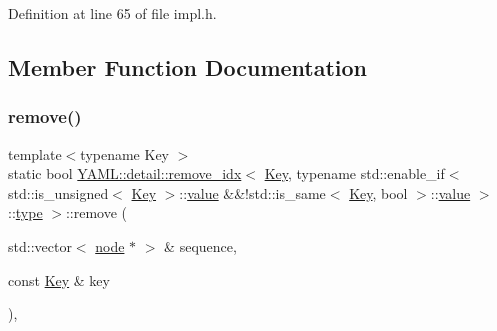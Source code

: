 Definition at line 65 of file impl.\+h.



\subsection{Member Function Documentation}
\mbox{\label{struct_y_a_m_l_1_1detail_1_1remove__idx_3_01_key_00_01typename_01std_1_1enable__if_3_01std_1_1is35fbbe9db9bd491994160c565f84eb78_a93fc34a71dc2dc338f9ebdd23f9e5bab}} 
\subsubsection{\texorpdfstring{remove()}{remove()}}
{\footnotesize\ttfamily template$<$typename Key $>$ \\
static bool \mbox{\hyperlink{struct_y_a_m_l_1_1detail_1_1remove__idx}{Y\+A\+M\+L\+::detail\+::remove\+\_\+idx}}$<$ \mbox{\hyperlink{namespace_y_a_m_l_a67c320aa50d3de7ecba1d0b8775dd684a1af533fc24b0311b8c4d5ac2870283aa}{Key}}, typename std\+::enable\+\_\+if$<$ std\+::is\+\_\+unsigned$<$ \mbox{\hyperlink{namespace_y_a_m_l_a67c320aa50d3de7ecba1d0b8775dd684a1af533fc24b0311b8c4d5ac2870283aa}{Key}} $>$\+::\mbox{\hyperlink{glad_8h_a03aff08f73d7fde3d1a08e0abd8e84fa}{value}} \&\&!std\+::is\+\_\+same$<$ \mbox{\hyperlink{namespace_y_a_m_l_a67c320aa50d3de7ecba1d0b8775dd684a1af533fc24b0311b8c4d5ac2870283aa}{Key}}, bool $>$\+::\mbox{\hyperlink{glad_8h_a03aff08f73d7fde3d1a08e0abd8e84fa}{value}} $>$\+::\mbox{\hyperlink{glad_8h_a890efa53b3d7deeeced6f3a0d6653ed3}{type}} $>$\+::remove (\begin{DoxyParamCaption}\item[{std\+::vector$<$ \mbox{\hyperlink{class_y_a_m_l_1_1detail_1_1node}{node}} $\ast$ $>$ \&}]{sequence,  }\item[{const \mbox{\hyperlink{namespace_y_a_m_l_a67c320aa50d3de7ecba1d0b8775dd684a1af533fc24b0311b8c4d5ac2870283aa}{Key}} \&}]{key }\end{DoxyParamCaption})\hspace{0.3cm}{\ttfamily [inline]}, {\ttfamily [static]}}



